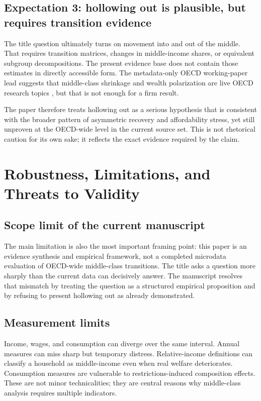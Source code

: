 \documentclass[11pt]{article}
\begin{document}
\subsection{Expectation 3: hollowing out is plausible, but requires transition evidence}
The title question ultimately turns on movement into and out of the middle. That requires transition matrices, changes in middle-income shares, or equivalent subgroup decompositions. The present evidence base does not contain those estimates in directly accessible form. The metadata-only OECD working-paper lead suggests that middle-class shrinkage and wealth polarization are live OECD research topics \citep{oecdeconomicsdepar2023one}, but that is not enough for a firm result.

The paper therefore treats hollowing out as a serious hypothesis that is consistent with the broader pattern of asymmetric recovery and affordability stress, yet still unproven at the OECD-wide level in the current source set. This is not rhetorical caution for its own sake; it reflects the exact evidence required by the claim.

\section{Robustness, Limitations, and Threats to Validity}

\subsection{Scope limit of the current manuscript}
The main limitation is also the most important framing point: this paper is an evidence synthesis and empirical framework, not a completed microdata evaluation of OECD-wide middle-class transitions. The title asks a question more sharply than the current data can decisively answer. The manuscript resolves that mismatch by treating the question as a structured empirical proposition and by refusing to present hollowing out as already demonstrated.

\subsection{Measurement limits}
Income, wages, and consumption can diverge over the same interval. Annual measures can miss sharp but temporary distress. Relative-income definitions can classify a household as middle-income even when real welfare deteriorates. Consumption measures are vulnerable to restrictions-induced composition effects. These are not minor technicalities; they are central reasons why middle-class analysis requires multiple indicators.
\end{document}
